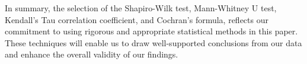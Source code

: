 In summary, the selection of the Shapiro-Wilk test, Mann-Whitney U test, Kendall's Tau correlation coefficient, and Cochran's formula, reflects our commitment to using rigorous and appropriate statistical methods in this paper. These techniques will enable us to draw well-supported conclusions from our data and enhance the overall validity of our findings.